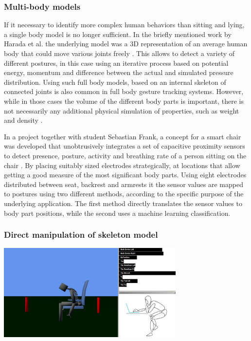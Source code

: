 \subsubsection{Multi-body models}
If it necessary to identify more complex human behaviors than sitting and lying, a single body model is no longer sufficient. In the briefly mentioned work by Harada et al. the underlying model was a 3D representation of an average human body that could move various joints freely \cite{harada2000human}. This allows to detect a variety of different postures, in this case using an iterative process based on potential energy, momentum and difference between the actual and simulated pressure distribution. Using such full body models, based on an internal skeleton of connected joints is also common in full body gesture tracking systems. However, while in those cases the volume of the different body parts is important, there is not necessarily any additional physical simulation of properties, such as weight and density \cite{Shotton2013}. 

In a project together with student Sebastian Frank, a concept for a smart chair was developed that unobtrusively integrates a set of capacitive proximity sensors to detect presence, posture, activity and breathing rate of a person sitting on the chair \cite{Braun2013ChairAid}. By placing suitably sized electrodes strategically, at locations that allow getting a good measure of the most significant body parts. Using eight electrodes distributed between seat, backrest and armrests it the sensor values are mapped to postures using two different methods, according to the specific purpose of the underlying application. The first method directly translates the sensor values to body part positions, while the second uses a machine learning classification.

\subsubsection*{Direct manipulation of skeleton model}
\begin{minipage}{\linewidth}
\centering
\includegraphics[width=0.7\textwidth]{images/smartchair_software}
\label{fig:smartchair_skeleton_model}
\end{minipage}

